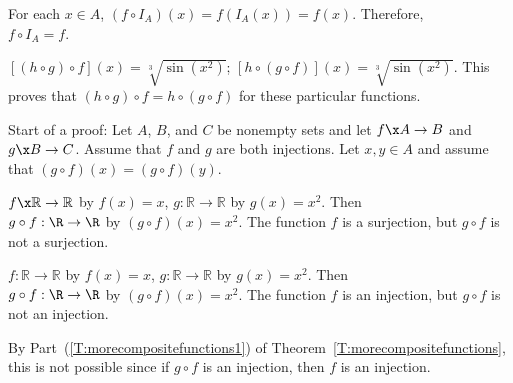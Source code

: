 \vskip6pt
\begin{list}{\bf{\ref{exer:sec64-4}.}}
\item \begin{list}{\bf{(a)}}
\item For each  $x \in A$, $( {f \circ I_A } )( x ) = f( {I_A ( x )} ) = f( x )$.  Therefore, \\$f \circ I_A  = f$.
\end{list}
\end{list}



\vskip6pt
\begin{list}{\bf{\ref{exer:sec64-3}.}}
\item \begin{list}{\bf{(a)}}
\item $\left[ {( {h \circ g} ) \circ f} \right]( x ) = \sqrt[3]{{\sin ( {x^2 } )}}$; 
$\left[ {h \circ ( {g \circ f} )} \right]( x ) = \sqrt[3]{{\sin ( {x^2 } )}}$.  This proves that $(h \circ g) \circ f = h \circ (g \circ f)$ for these particular functions.
\end{list}
\end{list}


\begin{list}{\bf{\ref{exer:sec64-5}.}}
\item Start of a proof:  Let  $A$, $B$, and  $C$  be nonempty sets and let  $f\x A \to B$  and  
$g\x B \to C$.  Assume that  
$f$  and  $g$  are both injections.  Let  $x, y \in A$ and assume that  
$( {g \circ f} )( x ) = ( {g \circ f} )( y )$.  
\end{list}


\begin{list}{\bf{\ref{exer:sec64-8}.}}
\item \begin{list}{\bf{(a)}}
\item $f\x \mathbb{R} \to \mathbb{R}$ by $f ( x ) = x$, 
$g: \mathbb{R} \to \mathbb{R}$ by $g ( x ) = x^2$.  Then \\$g \circ f: \R \to \R$ by $(g \circ f)(x) = x^2$.  The function $f$ is a surjection, but $g \circ f$ is not a surjection.
\end{list}
\end{list}

\begin{list}{}
\item \begin{list}{\bf{(b)}}
\item $f: \mathbb{R} \to \mathbb{R}$ by $f \left( x \right) = x$, 
$g: \mathbb{R} \to \mathbb{R}$ by $g \left( x \right) = x^2$.  Then \\$g \circ f: \R \to \R$ by $(g \circ f)(x) = x^2$.  The function $f$ is an injection, but $g \circ f$ is not an injection.
\end{list}
\end{list}


\begin{list}{}
\item \begin{list}{\bf{(f)}}
\item By Part~(\ref{T:morecompositefunctions1}) of Theorem~\ref{T:morecompositefunctions}, this is not possible since if $g \circ f$ is an injection, then $f$ is an injection.
\end{list}
\end{list}
\hbreak


\endinput


